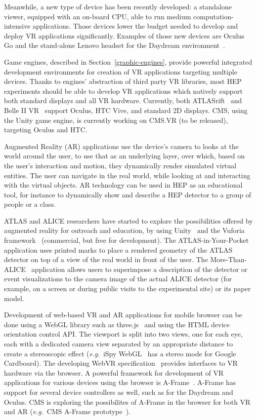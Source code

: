 \documentclass[12pt,a4paper]{article}
\begin{document}
Meanwhile, a new type of device has been recently developed: a standalone viewer, equipped with an on-board CPU, able to run
medium computation-intensive applications. Those devices lower the budget needed to develop and deploy VR applications significantly.
Examples of those new devices are Oculus Go\cite{OculusGo} and the stand-alone Lenovo headset for the
Daydream environment~\cite{LenovoMirageSolo}.

Game engines, described in Section~\ref{graphic-engines},  provide powerful integrated development environments for
creation of VR applications targeting multiple devices. Thanks to engines' abstraction of third party VR libraries,
most HEP experiments should be able to develop VR applications which natively support both standard displays and all VR hardware.
Currently, both ATLASrift~\cite{ATLASRift} and Belle II VR~\cite{BelleIIVR} support Oculus, HTC Vive,
and standard 2D displays. CMS, using the Unity game engine, is currently working on CMS.VR (to be released), targeting Oculus and HTC.

Augmented Reality (AR) applications use the device's camera to looks at the world around the user, to use that as an underlying layer,
over which, based on the user's interaction and motion, they dynamically render simulated virtual entities. The user can navigate in the real world, while
looking at and interacting with the virtual objects. AR technology can be used in HEP as an educational tool, for instance to
dynamically show and describe a HEP detector to a group of people or a class.

ATLAS and ALICE researchers have started to explore the possibilities offered by augmented reality for outreach and education,
by using Unity~\cite{Unity3D} and the Vuforia framework~\cite{VuforiaAR} (commercial, but free for development). The ATLAS-in-Your-Pocket~\cite{AtlasPocket} application
uses printed marks to place a rendered geometry of the ATLAS detector on top of a view of the real world in front of the user.
The More-Than-ALICE~\cite{MoreThanALICE} application allows users to superimpose a description of the detector or event visualizations to the camera image of the actual
ALICE detector (for example, on a screen or during public visits to the experimental site) or its paper model.

Development of web-based VR and AR applications for mobile browser can be done using a WebGL library such as three.js~\cite{ThreeJS} and using the
HTML device orientation control API. The viewport is split into two views, one for each eye, each with a dedicated camera view separated
by an appropriate distance to create a stereoscopic effect ({\it e.g.}\ iSpy WebGL~\cite{CMSISpyWebGL} has a stereo mode for Google Cardboard). 
The developing WebVR specification~\cite{WebVR} provides interfaces to VR hardware via the browser. A powerful framework for
development of VR applications for various devices using the browser is A-Frame~\cite{AFrame}. A-Frame has support for several device controllers as well,
such as for the Daydream and Oculus. CMS is exploring the possibilites of A-Frame in the
browser for both VR and AR ({\it e.g.}\ CMS A-Frame prototype~\cite{CMSAFrame}).
\end{document}
